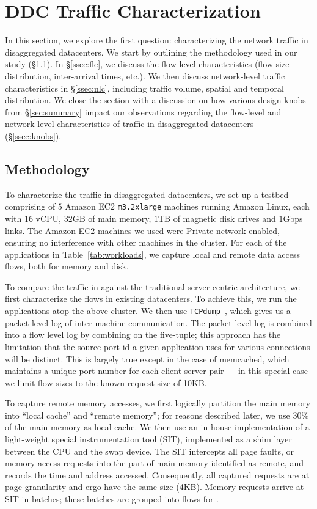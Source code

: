 \section{DDC Traffic Characterization}
\label{sec:workloads}
In this section, we explore the first question: characterizing the network traffic in disaggregated datacenters. We start by outlining the methodology used in our study (\S\ref{ssec:method1}). In \S\ref{ssec:flc}, we discuss the flow-level characteristics (flow size distribution, inter-arrival times, etc.). We then discuss network-level traffic characteristics in \S\ref{ssec:nlc}, including traffic volume, spatial and temporal distribution. We close the section with a discussion on how various design knobs from \S\ref{sec:summary} impact our observations regarding the flow-level and network-level characteristics of traffic in disaggregated datacenters (\S\ref{ssec:knobs}).

\subsection{Methodology}
\label{ssec:method1} 
To characterize the traffic in disaggregated datacenters, we set up a testbed comprising of $5$ Amazon EC2 \texttt{m3.2xlarge} machines running Amazon Linux, each with $16$ vCPU, $32$GB of main memory, $1$TB of magnetic disk drives and $1$Gbps links. The Amazon EC2 machines we used were Private network enabled, ensuring no interference with other machines in the cluster. For each of the applications in Table~\ref{tab:workloads}, we capture local and remote data access flows, both for memory and disk.

To compare the traffic in \dis against the traditional server-centric architecture, we first characterize the flows in existing datacenters. To achieve this, we run the applications atop the above cluster. We then use {\tt TCPdump}~\cite{tcpdump}, which gives us a packet-level log of inter-machine communication. The packet-level log is combined into a flow level log by combining on the five-tuple; this approach has the limitation that the source port id a given application uses for various connections will be distinct. This is largely true except in the case of memcached, which maintains a unique port number for each client-server pair --- in this special case we limit flow sizes to the known request size of 10KB.

To capture remote memory accesses, we first logically partition the main memory into ``local cache'' and ``remote memory''; for reasons described later, we use $30\%$ of the main memory as local cache. We then use an in-house implementation of a light-weight special instrumentation tool (SIT), implemented as a shim layer between the CPU and the swap device. The SIT intercepts all page faults, or memory access requests into the part of main memory identified as remote, and records the time and address accessed. Consequently, all captured requests are at page granularity and ergo have the same size (4KB). Memory requests arrive at SIT in batches; these batches are grouped into flows for \dis.

